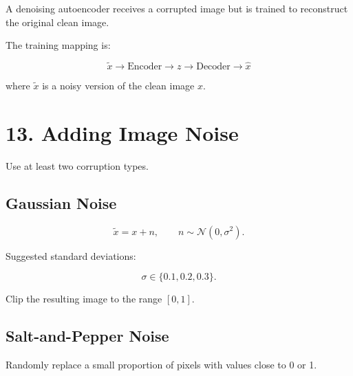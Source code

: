 \documentclass[10pt]{article}
\begin{document}
A denoising autoencoder receives a corrupted image but is trained to
reconstruct the original clean image.

The training mapping is:

\[
\boxed{\tilde{x}\rightarrow\text{Encoder}\rightarrow z
\rightarrow\text{Decoder}\rightarrow\hat{x}}
\]

where $\tilde{x}$ is a noisy version of the clean image $x$.

\begin{center}
\end{center}

\section*{13. Adding Image Noise}

Use at least two corruption types.

\subsection*{Gaussian Noise}

\[
\tilde{x}=x+n,
\qquad
n\sim\mathcal{N}(0,\sigma^2).
\]

Suggested standard deviations:

\[
\sigma\in\{0.1,0.2,0.3\}.
\]

Clip the resulting image to the range $[0,1]$.

\subsection*{Salt-and-Pepper Noise}

Randomly replace a small proportion of pixels with values close to 0 or 1.
\end{document}
